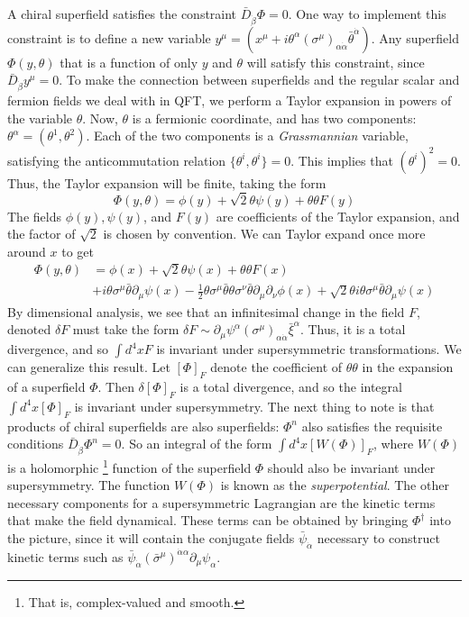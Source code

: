 A chiral superfield satisfies the constraint $\bar{D}_{\dot{\beta}}\Phi = 0$. One way to implement this constraint is to define a new variable $y^\mu=(x^\mu+i\theta^\alpha(\sigma^\mu)_{\alpha\dot{\alpha}}\bar{\theta}^{\dot{\alpha}})$. Any superfield $\Phi(y,\theta)$ that is a function of only $y$ and $\theta$ will satisfy this constraint, since $\bar{D}_{\dot{\beta}}y^\mu = 0$. To make the connection between superfields and the regular scalar and fermion fields we deal with in QFT, we perform a Taylor expansion in powers of the variable $\theta$. Now, $\theta$ is a fermionic coordinate, and has two components: $\theta^\alpha = (\theta^1,\theta^2)$. Each of the two components is a \emph{Grassmannian} variable, satisfying the anticommutation relation $\{\theta^i,\theta^i\} = 0$. This implies that $(\theta^i)^2 = 0$. Thus, the Taylor expansion will be finite, taking the form
\[\Phi(y,\theta) = \phi(y) + \sqrt{2}\theta\psi(y)+\theta\theta F(y)\]
The fields $\phi(y),\psi(y)$, and $F(y)$ are coefficients of the Taylor expansion, and the factor of $\sqrt{2}$ is chosen by convention. We can Taylor expand once more around $x$ to get
\begin{align*}
  \Phi(y,\theta) &= \phi(x) + \sqrt{2}\theta\psi(x)+\theta\theta F(x)\\
  &+i\theta\sigma^\mu\bar{\theta}\partial_\mu\psi(x)-\frac{1}{2}\theta\sigma^\mu\bar{\theta}\theta\sigma^\nu\bar{\theta}\partial_\mu\partial_\nu\phi(x) + \sqrt{2}\theta i\theta\sigma^\mu\bar{\theta}\partial_\mu\psi(x)
  \label{eq:superfield_expansion}
\end{align*}
By dimensional analysis, we see that an infinitesimal change in the field $F$, denoted $\delta F$ must take the form $\delta F\sim\partial_\mu\psi^\alpha(\sigma^\mu)_{\alpha\dot{\alpha}}\bar{\xi}^\alpha$. Thus, it is a total divergence, and so $\int d^4x F$ is invariant under supersymmetric transformations. We can generalize this result. Let $[\Phi]_F$ denote the coefficient of $\theta\theta$ in the expansion of a superfield $\Phi$. Then $\delta[\Phi]_F$ is a total divergence, and so the integral $\int d^4x [\Phi]_F$ is invariant under supersymmetry. The next thing to note is that products of chiral superfields are also superfields: $\Phi^n$ also satisfies the requisite conditions $\bar{D}_{\dot{\beta}}\Phi^n = 0$. So an integral of the form $\int d^4x[W(\Phi)]_F$, where $W(\Phi)$ is a holomorphic \footnote{That is, complex-valued and smooth.} function of the superfield $\Phi$ should also be invariant under supersymmetry. The function $W(\Phi)$ is known as the \emph{superpotential}. The other necessary components for a supersymmetric Lagrangian are the kinetic terms that make the field dynamical. These terms can be obtained by bringing $\Phi^\dagger$ into the picture, since it will contain the conjugate fields $\bar{\psi}_{\dot{\alpha}}$ necessary to construct kinetic terms such as $\bar{\psi}_{\dot{\alpha}}(\bar{\sigma}^\mu)^{\dot{\alpha}\alpha}\partial_\mu\psi_\alpha$. 

